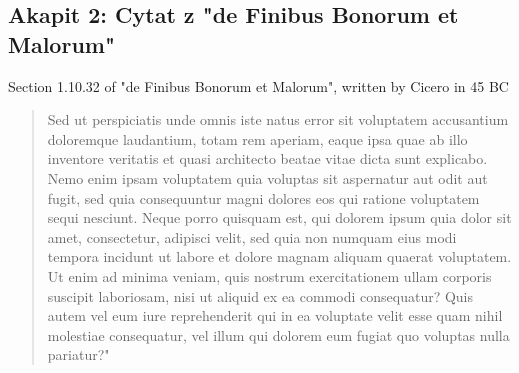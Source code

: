 \subsection*{Akapit 2: Cytat z "de Finibus Bonorum et Malorum"}

Section 1.10.32 of "de Finibus Bonorum et Malorum", written by Cicero in 45 BC
\begin{quote}
    Sed ut perspiciatis unde omnis iste natus error sit voluptatem accusantium doloremque laudantium, totam rem aperiam, eaque ipsa quae ab illo inventore veritatis et quasi architecto beatae vitae dicta sunt explicabo. Nemo enim ipsam voluptatem quia voluptas sit aspernatur aut odit aut fugit, sed quia consequuntur magni dolores eos qui ratione voluptatem sequi nesciunt. Neque porro quisquam est, qui dolorem ipsum quia dolor sit amet, consectetur, adipisci velit, sed quia non numquam eius modi tempora incidunt ut labore et dolore magnam aliquam quaerat voluptatem. Ut enim ad minima veniam, quis nostrum exercitationem ullam corporis suscipit laboriosam, nisi ut aliquid ex ea commodi consequatur? Quis autem vel eum iure reprehenderit qui in ea voluptate velit esse quam nihil molestiae consequatur, vel illum qui dolorem eum fugiat quo voluptas nulla pariatur?"
\end{quote}

